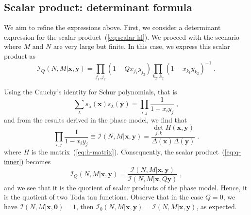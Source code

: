 \documentclass[a4paper,11pt]{amsart}
\begin{document}
\subsection{Scalar product: determinant formula}
We aim to refine the expressions above. First, we consider a
determinant expression for the scalar product~(\ref{eq:scalar-hl}). We
proceed with the scenario where \(M\) and \(N\) are very large but
finite. In this case, we express this scalar product as
\begin{equation}
\label{eq:q-inner}
  \mathcal{I}_Q(N,M | \bm{x}, \bm{y})  
= \prod_{j_1, j_2} (1-Q x_{j_1} y_{j_2}) \prod_{k_2, k_2}(1 - x_{k_1} y_{k_2})^{-1}\; .
\end{equation}

Using the Cauchy's identity for Schur polynomials, that is 
\begin{equation}
  \sum_\lambda s_\lambda(\bm{x}) s_\lambda(\bm{y}) = \prod_{i,j} \frac{1}{1 - x_i y_j}\; ,
\end{equation}
and from the results derived in the phase model, we find that
\begin{equation}
  \prod_{i,j}\frac{1}{1 - x_i y_j}  \equiv \mathcal{I}(N,M|\bm{x}, \bm{y}) = 
  \frac{\det_{j,k}H(\bm{x},\bm{y})}{\Delta(\bm{x}) \Delta(\bm{y})}\; .
\end{equation}
where \(H\) is the matrix~(\ref{eq:h-matrix}). Consequently, the scalar
product~(\ref{eq:q-inner}) becomes
\begin{equation}
  \mathcal{I}_Q(N,M | \bm{x}, \bm{y})  
= \frac{\mathcal{I}(N,M|\bm{x}, \bm{y})}{\mathcal{I}(N,M|\bm{x}, Q\bm{y})}\; , 
\end{equation}
and we see that it is the quotient of scalar products of the phase
model. Hence, it is the quotient of two Toda tau functions.
Observe that in the case \(Q = 0\), we have \(\mathcal{I}(N, M|
\bm{x}, \bm{0}) = 1\), then \(\mathcal{I}_0(N,M | \bm{x}, \bm{y})
= \mathcal{I}(N,M | \bm{x}, \bm{y})\), as expected.
\end{document}
